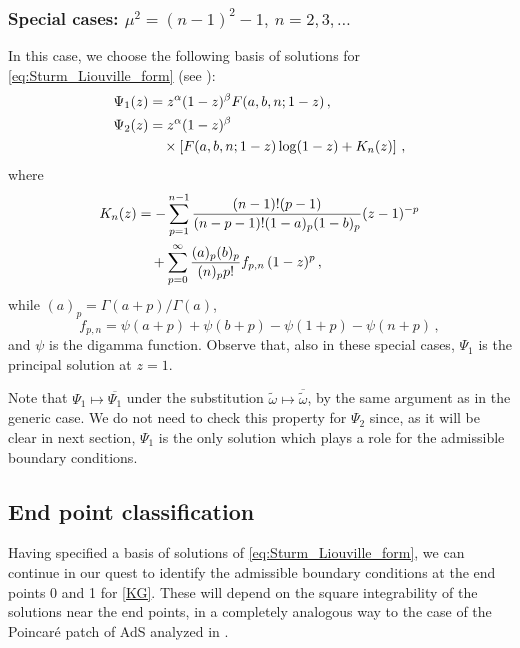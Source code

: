 \documentclass[aps, prd, amsmath, floats, floatfix, twocolumn, nofootinbib, superscriptaddress, showpacs]{revtex4-1}
\def\tomega{{\tilde{\omega}}}
\begin{document}
	
	\subsubsection{Special cases: $\mu^2 = (n-1)^2-1, \ n=2,3,\dots$}
	
	In this case, we choose the following basis of solutions for \eqref{eq:Sturm_Liouville_form} (see \cite[\S 15.10.8]{NIST}):
	\begin{subequations} \label{eq:z1spec}
	\begin{align}
	\Psi_1(z) & =z^\alpha(1-z)^\beta F(a,b,n;1-z) \label{Psi1b} \, , \\
	\Psi_2(z) & =z^\alpha(1-z)^{\beta} \notag \\
	&\quad \times \left[ F(a,b,n;1-z) \log(1-z) + K_n(z) \right]\label{Psi2b} \, ,
	\end{align}
	\end{subequations}
	where
	\begin{align}
	K_n(z) &= -\sum_{p=1}^{n-1}\frac{(n-1)!(p-1)}{(n-p-1)!(1-a)_p(1-b)_p}(z-1)^{-p} \notag \\
		 &\quad +\sum_{p=0}^{\infty} \frac{(a)_p(b)_p}{(n)_p p!} f_{p,n} \, (1-z)^p \, , \label{eq:G}
	\end{align}
	while $(a)_p = \Gamma(a+p)/\Gamma(a)$,
	\begin{equation*}
	f_{p,n} = \psi(a+p)+\psi(b+p) -\psi(1+p)-\psi(n+p) \, ,
	\end{equation*}
	and $\psi$ is the digamma function. Observe that, also in these special cases, $\Psi_1$ is the principal solution at $z=1$. 

	Note that $\Psi_1 \mapsto \overline{\Psi_1}$ under the substitution $\tomega \mapsto \overline{\tomega}$, by the same argument as in the generic case. We do not need to check this property for $\Psi_2$ since, as it will be clear in next section, $\Psi_1$ is the only solution which plays a role for the admissible boundary conditions.


\subsection{End point classification} 
\label{sec:endpoints}


Having specified a basis of solutions of \eqref{eq:Sturm_Liouville_form}, we can continue in our quest to identify the admissible boundary conditions at the end points 0 and 1 for \eqref{KG}. These will depend on the square integrability of the solutions near the end points, in a completely analogous way to the case of the Poincar\'e patch of AdS analyzed in \cite{Dappiaggi:2016fwc}.
\end{document}
